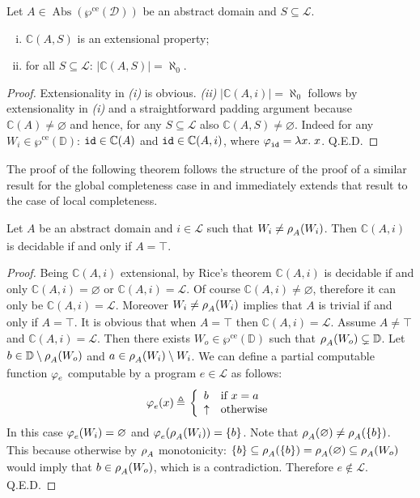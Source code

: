 \documentclass[runningheads]{llncs}
\def\ok#1{\mbox{\raisebox{0ex}[1ex][1ex]{$#1$}}}
\newcommand{\myqed}{\textsc{Q.E.D.}}
\def\wpre{\wp^{\text{ce}}}
\def\bbbc{{\mathbb{C}}}
\newcommand{\ccL}{\mathscr{L}}
\newcommand{\ccD}{\mathscr{D}}
\newcommand{\Domain}{\mathbb{D}}
\newcommand{\pfunction}[3]{\ok{\varphi^{#2\, #3}_{#1}}}
\newcommand{\auco}[2]{\ok{\rho^{#1}_{#2}}}
\DeclareMathOperator{\Abs}{Abs}
\newcommand{\ud}{\ok{\:\triangleq\:}}
\def\ok#1{\mbox{\raisebox{0ex}[1ex][1ex]{$#1$}}}
\def\cAA{\ensuremath{A}}
\begin{document}
\begin{proposition}\label{basic-prop}
Let $\cAA\in\Abs(\wpre(\ccD))$ be an abstract domain and
$S\subseteq\ccL$.
\begin{enumerate}[(i)]
\item 
$\bbbc(\cAA,S)$ is an extensional property;
\item
for all $S\subseteq\ccL$: $|\bbbc(\cAA,S)|=\aleph_0$.
\end{enumerate}
\end{proposition}
\begin{proof}
Extensionality in {\em (i)} is obvious.
{\em (ii)} $|\bbbc(\cAA,i)|=\aleph_0$ follows by extensionality in {\em (i)} and 
a straightforward padding argument because $\bbbc(\cAA)\neq\varnothing$ and hence, for any $S\subseteq\ccL$ also $\bbbc(\cAA,S)\neq\varnothing$. Indeed for any  
$W_i\in\wpre(\Domain)$: ${\tt id}\in\bbbc(\cAA)$ and ${\tt id}\in\bbbc(\cAA,i)$, where $\pfunction{{\tt id}}{}{}=\lambda x.\; x$. \myqed
\end{proof}

The proof of the following theorem follows the structure of the proof of a similar result for the global completeness case in \cite{GiacobazziLR15} and immediately extends that result to the case of local completeness.

\begin{theorem}\label{Decidable-C}
    Let $\cAA$ be an abstract domain and $i\in\ccL$ such that $W_i\neq\auco{}{A}(W_i)$.
    Then $\bbbc(\cAA,i)$ is decidable if and only if $\cAA=\top$.
\end{theorem}

\begin{proof}
    Being $\bbbc(\cAA,i)$ extensional, by Rice's theorem $\bbbc(\cAA,i)$ is decidable if and only $\bbbc(\cAA,i)=\varnothing$ or $\bbbc(\cAA,i)=\ccL$. Of course $\bbbc(\cAA,i)\neq\varnothing$, therefore it can only be $\bbbc(\cAA,i)=\ccL$. Moreover $W_i\neq\auco{}{A}(W_i)$ implies that $\cAA$ is trivial if and only if $\cAA=\top$. It is obvious that when $\cAA=\top$ then $\bbbc(\cAA,i)=\ccL$. Assume $\cAA\neq\top$ and $\bbbc(\cAA,i)=\ccL$. Then there exists $W_o\in\wpre(\Domain)$ such that $\auco{}{A}(W_o)\subsetneq\Domain$. Let $b\in\Domain\setminus\auco{}{A}(W_o)$ and $a\in \auco{}{A}(W_i)\setminus W_i$. We can define a partial computable function $\pfunction{e}{}{}$ computable by a program $e\in\ccL$ as follows:
    $$\pfunction{e}{}{}(x)\ud \left\{
    \begin{array}{ll}
       b & \mbox{if $x=a$}\\
       \uparrow &\mbox{otherwise}
    \end{array}
    \right .
    $$
    In this case $\pfunction{e}{}{}(W_i)=\varnothing$ and 
    $\pfunction{e}{}{}(\auco{}{A}(W_i))=\{b\}$. Note that 
    $\auco{}{A}(\varnothing)\neq \auco{}{A}(\{b\})$. This because 
    otherwise by $\auco{}{A}$ monotonicity: $\{b\}\subseteq \auco{}{A}(\{b\})=\auco{}{A}(\varnothing)\subseteq \auco{}{A}(W_o)$ would imply that 
    $b\in \auco{}{A}(W_o)$, which is a contradiction. Therefore $e\not\in\ccL$. \myqed
\end{proof}
\end{document}
